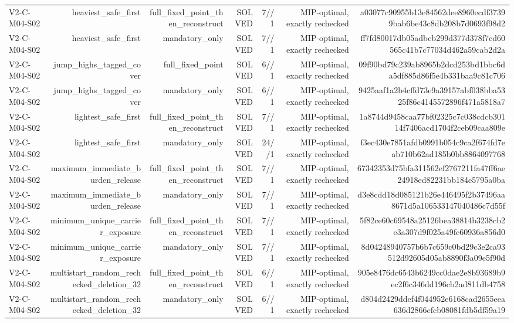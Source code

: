 {\begin{longtable}{lrrrrrr}
V2-C-M04-S02 & heaviest\_safe\_first & full\_fixed\_point\_then\_reconstruct & SOLVED & 7//1 & MIP-optimal, exactly rechecked & a03077c90955b13e84562dee8960ecdf37399bab6be43c8db208b7d0693f98d2 \\
V2-C-M04-S02 & heaviest\_safe\_first & mandatory\_only & SOLVED & 7//1 & MIP-optimal, exactly rechecked & ff7fd80017db05adbeb299d377d378f7cd60565c41b7c77034d462a59cab2d2a \\
V2-C-M04-S02 & jump\_highs\_tagged\_cover & full\_fixed\_point & SOLVED & 6//1 & MIP-optimal, exactly rechecked & 09f90bd79c239ab8965b2dcd253bd1bbc6da5df885d86f5e4b331baa9c81c706 \\
V2-C-M04-S02 & jump\_highs\_tagged\_cover & mandatory\_only & SOLVED & 6//1 & MIP-optimal, exactly rechecked & 9425aaf1a2b4cffd73e9a39157abf038bba5325f86c4145572896f471a5818a7 \\
V2-C-M04-S02 & lightest\_safe\_first & full\_fixed\_point\_then\_reconstruct & SOLVED & 7//1 & MIP-optimal, exactly rechecked & 1a8744d9458caa77bf02325c7c038cdcb30114f7406acd1704f2ceb09caa809e \\
V2-C-M04-S02 & lightest\_safe\_first & mandatory\_only & SOLVED & 24//1 & MIP-optimal, exactly rechecked & f3ec430e7851afdb0991b054c9ca2f674fd7eab710b62ad185b0bb8864097768 \\
V2-C-M04-S02 & maximum\_immediate\_burden\_release & full\_fixed\_point\_then\_reconstruct & SOLVED & 7//1 & MIP-optimal, exactly rechecked & 67342353d75bfa311562ef2767211fa47ff6ae24918ed82231bb184e5795a0ba \\
V2-C-M04-S02 & maximum\_immediate\_burden\_release & mandatory\_only & SOLVED & 7//1 & MIP-optimal, exactly rechecked & d3e8cdd18d085121b26e446495f2b37496aa8671d5a106533147040486c7d55f \\
V2-C-M04-S02 & minimum\_unique\_carrier\_exposure & full\_fixed\_point\_then\_reconstruct & SOLVED & 7//1 & MIP-optimal, exactly rechecked & 5f82ce60c69548a25126bea38814b3238cb2e3a307d9f025a49fc60936a856d0 \\
V2-C-M04-S02 & minimum\_unique\_carrier\_exposure & mandatory\_only & SOLVED & 7//1 & MIP-optimal, exactly rechecked & 8d04248940757b6b7c659c0bd29c3e2ca93512d92605d05ab8890f3a09e5f90d \\
V2-C-M04-S02 & multistart\_random\_rechecked\_deletion\_32 & full\_fixed\_point\_then\_reconstruct & SOLVED & 6//1 & MIP-optimal, exactly rechecked & 905e8476dc6543b6249cc0dae2e8b93689b9ec2f6c346dd196cb2ad811db4758 \\
V2-C-M04-S02 & multistart\_random\_rechecked\_deletion\_32 & mandatory\_only & SOLVED & 6//1 & MIP-optimal, exactly rechecked & d804d2429ddef4f044952e6168cad2655eea636d2866cfcb08081fdb5df59a19 \\

\end{longtable}}
